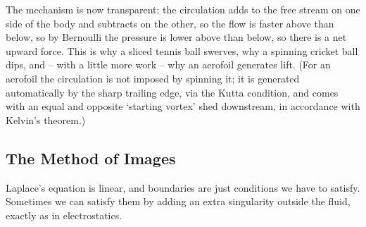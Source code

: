 \documentclass[a4paper]{scrartcl}
\begin{document}
\begin{center}
\end{center}

The mechanism is now transparent: the circulation adds to the free stream on one side of the body and subtracts on the other, so the flow is faster above than below, so by Bernoulli the pressure is lower above than below, so there is a net upward force. This is why a sliced tennis ball swerves, why a spinning cricket ball dips, and -- with a little more work -- why an aerofoil generates lift. (For an aerofoil the circulation is not imposed by spinning it; it is generated automatically by the sharp trailing edge, via the Kutta condition, and comes with an equal and opposite `starting vortex' shed downstream, in accordance with Kelvin's theorem.)

\subsection{The Method of Images}

Laplace's equation is linear, and boundaries are just conditions we have to satisfy. Sometimes we can satisfy them by adding an extra singularity outside the fluid, exactly as in electrostatics.
\end{document}
